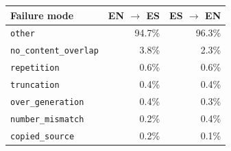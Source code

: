 \begin{tabular}{lrr}
\toprule
Failure mode & EN $\rightarrow$ ES & ES $\rightarrow$ EN \\
\midrule
\texttt{other} & 94.7\% & 96.3\% \\
\texttt{no\_content\_overlap} & 3.8\% & 2.3\% \\
\texttt{repetition} & 0.6\% & 0.6\% \\
\texttt{truncation} & 0.4\% & 0.4\% \\
\texttt{over\_generation} & 0.4\% & 0.3\% \\
\texttt{number\_mismatch} & 0.2\% & 0.4\% \\
\texttt{copied\_source} & 0.2\% & 0.1\% \\
\bottomrule
\end{tabular}
